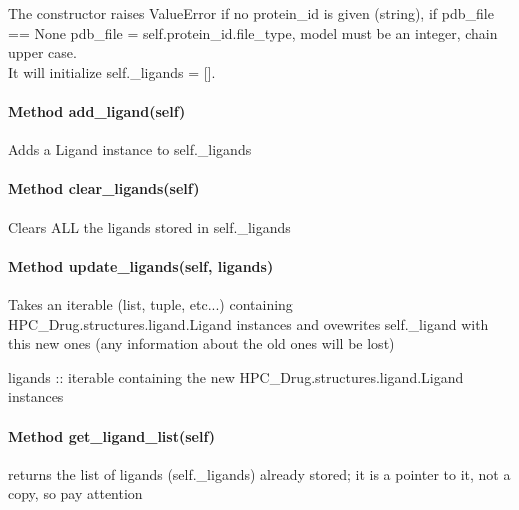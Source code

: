             $\ $\\The constructor raises ValueError if no protein\_id is given (string), if pdb\_file == None pdb\_file = {self.protein\_id}.{file\_type}, model must be an integer, chain upper case.\\
            It will initialize self.\_ligands = [].

        \paragraph{Method add\_ligand(self)}

            Adds a Ligand instance to self.\_ligands

        \paragraph{Method clear\_ligands(self)}

            Clears ALL the ligands stored in self.\_ligands

        \paragraph{Method update\_ligands(self, ligands)}
        
            Takes an iterable (list, tuple, etc...) containing HPC\_Drug.structures.ligand.Ligand 
            instances and ovewrites self.\_ligand with this new ones (any information about the old ones will be lost)
            
            ligands :: iterable containing the new HPC\_Drug.structures.ligand.Ligand instances

        \paragraph{Method get\_ligand\_list(self)}
            
            returns the list of ligands (self.\_ligands) already stored; it is a pointer to it, not a copy, so pay attention


